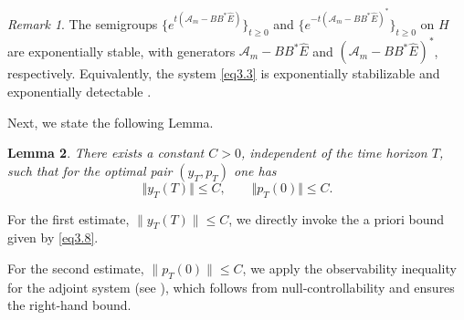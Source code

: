 \documentclass[10pt, a4]{amsart}
\makeatletter
\theoremstyle{plain}
\newtheorem{lemma}{Lemma}[section]
\theoremstyle{definition}
\theoremstyle{remark}
\newtheorem{remark}[lemma]{Remark}
\renewenvironment{proof}[1][\proofname]{\par
  \pushQED{\qed}%
  \normalfont \topsep6\p@\@plus6\p@\relax
  \trivlist
  \item[\hskip\labelsep
        \itshape
    #1\ \ref{#1}.]\ignorespaces
}{%
  \popQED\endtrivlist\@endpefalse
}
\numberwithin{equation}{section}
\makeatother
\begin{document}
\begin{remark}
 The semigroups
 $\{e^{t(\mathcal{A}_m - B B^* \hat{E})}\}_{t\ge0}$ and
 $\{e^{-t(\mathcal{A}_m - B B^* \hat{E})^*}\}_{t\ge0}$ on $H$ are exponentially stable, with generators $\mathcal{A}_m - B B^* \hat{E}$ and $(\mathcal{A}_m - B B^* \hat{E})^*$, respectively. Equivalently, the system \eqref{eq3.3} is exponentially stabilizable and exponentially detectable \cite{ref32}.
\end{remark}
 
Next, we state the following Lemma.

\begin{lemma}\label{le3.12}
There exists a constant $C>0$, independent of the time horizon $T$, such that for the optimal pair $(y_T,p_T)$ one has
\[
\Vert y_T(T)\Vert \leq C,\qquad \Vert p_T(0)\Vert \leq C.
\]
\end{lemma}
\begin{proof}[of Lemma \ref{le3.12}]
For the first estimate, \(\|y_T(T)\|\le C\), we directly invoke the a priori bound given by \eqref{eq3.8}. 

For the second estimate, \(\|p_T(0)\|\le C\), we apply the observability inequality for the adjoint system (see \cite[Proposition 3.1, p. 39]{ref27}), which follows from null‑controllability and ensures the right‑hand bound.
\end{proof}

\end{document}
